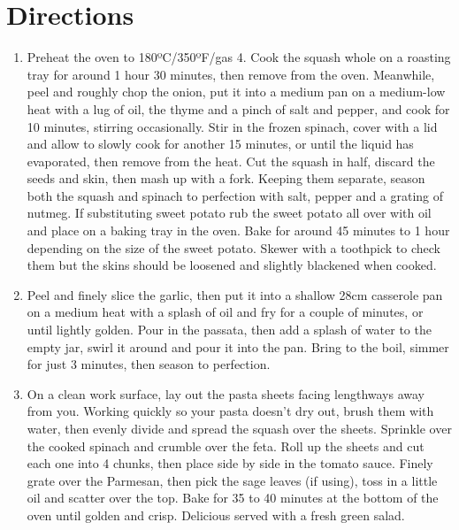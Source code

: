 \section*{Directions}
\begin{enumerate}
	\item Preheat the oven to 180ºC/350ºF/gas 4. Cook the squash whole on a roasting tray for around 1 hour 30 minutes, then remove from the oven. Meanwhile, peel and roughly chop the onion, put it into a medium pan on a medium-low heat with a lug of oil, the thyme and a pinch of salt and pepper, and cook for 10 minutes, stirring occasionally. Stir in the frozen spinach, cover with a lid and allow to slowly cook for another 15 minutes, or until the liquid has evaporated, then remove from the heat. Cut the squash in half, discard the seeds and skin, then mash up with a fork. Keeping them separate, season both the squash and spinach to perfection with salt, pepper and a grating of nutmeg.  If substituting sweet potato rub the sweet potato all over with oil and place on a baking tray in the oven.  Bake for around 45 minutes to 1 hour depending on the size of the sweet potato. Skewer with a toothpick to check them but the skins should be loosened and slightly blackened when cooked.
	\item Peel and finely slice the garlic, then put it into a shallow 28cm casserole pan on a medium heat with a splash of oil and fry for a couple of minutes, or until lightly golden. Pour in the passata, then add a splash of water to the empty jar, swirl it around and pour it into the pan. Bring to the boil, simmer for just 3 minutes, then season to perfection.
	\item On a clean work surface, lay out the pasta sheets facing lengthways away from you. Working quickly so your pasta doesn't dry out, brush them with water, then evenly divide and spread the squash over the sheets. Sprinkle over the cooked spinach and crumble over the feta. Roll up the sheets and cut each one into 4 chunks, then place side by side in the tomato sauce. Finely grate over the Parmesan, then pick the sage leaves (if using), toss in a little oil and scatter over the top. Bake for 35 to 40 minutes at the bottom of the oven until golden and crisp. Delicious served with a fresh green salad.
\end{enumerate}


